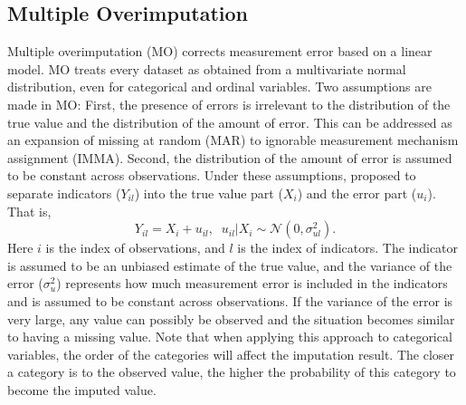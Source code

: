 \documentclass[oneside,a4paper]{article}
\begin{document}
\subsection{Multiple Overimputation}

Multiple overimputation (MO) corrects measurement error based on a linear model. MO treats every dataset as obtained from a multivariate normal distribution, even for categorical and ordinal variables. Two assumptions are made in MO: First, the presence of errors is irrelevant to the distribution of the true value and the distribution of the amount of error. This can be addressed as an expansion of missing at random (MAR) to ignorable measurement mechanism assignment (IMMA). Second, the distribution of the amount of error is assumed to be constant across observations. Under these assumptions,  proposed to separate indicators ($Y_{il}$) into the true value part ($X_{i}$) and the error part ($u_i$). That is,
\begin{equation}\label{mo}
Y_{il} = X_{i}+ u_{il}, \; \;
u_{il} | X_{i}  \sim \mathcal{N}(0,\sigma_{ul}^2).
\end{equation}
Here $i$ is the index of observations, and $l$ is the index of indicators. The indicator is assumed to be an unbiased estimate of the true value, and the variance of the error ($\sigma_{u}^2$) represents how much measurement error is included in the indicators and is assumed to be constant across observations. If the variance of the error is very large, any value can possibly be observed and the situation becomes similar to having a missing value. Note that when applying this approach to categorical variables, the order of the categories will affect the imputation result.  The closer a category is to the observed value, the higher the probability of this category to become the imputed value.
\end{document}

